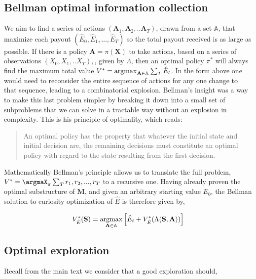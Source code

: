 \subsection*{Bellman optimal information collection}
We aim to find a series of actions $(\mathbf{A}_1, \mathbf{A}_2, ..\mathbf{A}_T)$, drawn from a set $\mathbb{A}$, that maximize each payout $(\hat E_0, \hat E_1, \ldots, \hat E_{T})$ so the total payout received is as large as possible. If there is a policy $\mathbf{A} = \pi(\mathbf{X})$ to take actions, based on a series of observations $(X_0, X_1, ..X_{T}),$, given by $\Lambda$, then an optimal policy $\pi^*$ will always find the maximum total value $V^* = \operatorname*{argmax}_{\mathbf{A} \in \mathbb{A}} \sum_T \hat E_t $. In the form above one would need to reconsider the entire sequence of actions for any one change to that sequence, leading to a combinatorial explosion. Bellman's insight was a way to make this last problem simpler by breaking it down into a small set of subproblems that we can solve in a tractable way without an explosion in complexity. This is his principle of optimality, which reads:

\begin{quote}
    An optimal policy has the property that whatever the initial state and initial decision are, the remaining decisions must constitute an optimal policy with regard to the state resulting from the first decision. \citep{Bellmann1954}
\end{quote}

Mathematically Bellman's principle allows us to translate the full problem, $V^* = \argmaX_{\pi} \sum_T r_1, r_2, ..., r_{T}$ to a recursive one. Having already proven the optimal substructure of $\mathbf{M}$, and given an arbitrary starting value $E_0$, the Bellman solution to curiosity optimization of $\hat E$ is therefore given by,

\begin{equation} 
	\label{eq:bellman_iter_E_app}
	V^*_{\hat E}(\mathbf{S}) = \operatorname*{argmax}_{\mathbf{A} \in \mathbb{A}} \Big [ \hat E_{t}  + V^*_{\hat E}(\Lambda(\mathbf{S},\mathbf{A})) \Big ]
\end{equation}


\subsection*{Optimal exploration} 

Recall from the main text we consider that a good exploration should,

